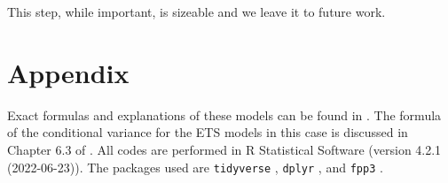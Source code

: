 \documentclass{monashthesis}
\begin{document}
This step, while important, is sizeable and we leave it to future work.

\appendix

\hypertarget{appendix}{%
\chapter{Appendix}\label{appendix}}

Exact formulas and explanations of these models can be found in \textcite{fpp3}. The formula of the conditional variance for the ETS models in this case is discussed in Chapter 6.3 of \textcite{HKOS08}. All codes are performed in R Statistical Software (version 4.2.1 (2022-06-23)). The packages used are \texttt{tidyverse} \autocite{tidy19}, \texttt{dplyr} \autocite{dplyr23}, and \texttt{fpp3} \autocite{fpp23}.

\printbibliography[title={Reference}]
\end{document}
